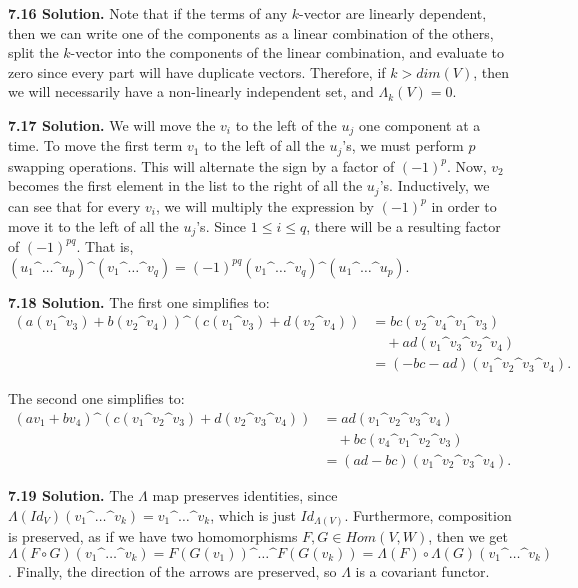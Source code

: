 \textbf{7.16 Solution.} Note that if the terms of any $k$-vector are linearly dependent, then we can write one of the components as a linear combination of the others, split the $k$-vector into the components of the linear combination, and evaluate to zero since every part will have duplicate vectors. Therefore, if $k > dim(V)$, then we will necessarily have a non-linearly independent set, and $\Lambda_k(V) = 0$.

\textbf{7.17 Solution.} We will move the $v_i$ to the left of the $u_j$ one component at a time. To move the first term $v_1$ to the left of all the $u_j$'s, we must perform $p$ swapping operations. This will alternate the sign by a factor of $(-1)^p$. Now, $v_2$ becomes the first element in the list to the right of all the $u_j$'s. Inductively, we can see that for every $v_i$, we will multiply the expression by $(-1)^p$ in order to move it to the left of all the $u_j$'s. Since $1 \leq i \leq q$, there will be a resulting factor of $(-1)^{pq}$. That is, $(u_1 \^ \dots \^ u_p) \^ (v_1 \^ \dots \^ v_q) = (-1)^{pq}(v_1 \^ \dots \^ v_q) \^ (u_1 \^ \dots \^ u_p)$.

\textbf{7.18 Solution.} The first one simplifies to:
\begin{align*}
    (a(v_1 \^ v_3) + b(v_2 \^ v_4)) \^ (c(v_1 \^ v_3) + d(v_2 \^ v_4)) &= bc(v_2 \^ v_4 \^ v_1 \^ v_3) \\
    &\quad + ad(v_1 \^ v_3 \^ v_2 \^ v_4) \\
    &= (-bc - ad)(v_1 \^ v_2 \^ v_3 \^ v_4).
\end{align*}

The second one simplifies to:
\begin{align*}
    (av_1 + bv_4) \^ (c(v_1 \^ v_2 \^ v_3) + d(v_2 \^ v_3 \^ v_4)) &= ad(v_1 \^ v_2 \^ v_3 \^ v_4) \\
    &\quad + bc(v_4 \^ v_1 \^ v_2 \^ v_3) \\
    &= (ad - bc)(v_1 \^ v_2 \^ v_3 \^ v_4).
\end{align*}

\textbf{7.19 Solution.} The $\Lambda$ map preserves identities, since $\Lambda(Id_V)(v_1 \^ \dots \^ v_k) = v_1 \^ \dots \^ v_k$, which is just $Id_{\Lambda(V)}$. Furthermore, composition is preserved, as if we have two homomorphisms $F, G \in Hom(V, W)$, then we get $\Lambda(F \circ G)(v_1 \^ \dots \^ v_k) = F(G(v_1)) \^ \dots \^ F(G(v_k)) = \Lambda(F) \circ \Lambda(G)(v_1 \^ \dots \^ v_k)$. Finally, the direction of the arrows are preserved, so $\Lambda$ is a covariant functor.


